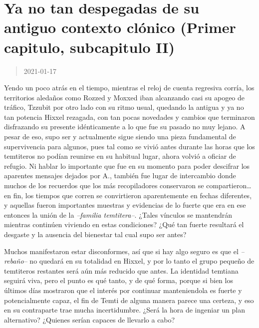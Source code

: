 \documentclass[
  spanish,
]{book}
\begin{document}
\hypertarget{ya-no-tan-despegadas-de-su-antiguo-contexto-cluxf3nico-primer-capitulo-subcapitulo-ii}{%
\section{Ya no tan despegadas de su antiguo contexto clónico (Primer capitulo, subcapitulo II)}\label{ya-no-tan-despegadas-de-su-antiguo-contexto-cluxf3nico-primer-capitulo-subcapitulo-ii}}

\begin{quote}
2021-01-17
\end{quote}

Yendo un poco atrás en el tiempo, mientras el reloj de cuenta regresiva corría, los territorios aledaños como Rozzed y Moxxed iban alcanzando casi su apogeo de tráfico, Tzzubit por otro lado con su ritmo usual, quedando la antigua y ya no tan potencia Hixxel rezagada, con tan pocas novedades y cambios que terminaron disfrazando su presente idénticamente a lo que fue su pasado no muy lejano.
A pesar de eso, supo ser y actualmente sigue siendo una pieza fundamental de supervivencia para algunos, pues tal como se vivió antes durante las horas que los temtiteros no podían reunirse en su habitual lugar, ahora volvió a oficiar de refugio. Ni hablar lo importante que fue en su momento para poder descifrar los aparentes mensajes dejados por A., también fue lugar de intercambio donde muchos de los recuerdos que los más recopiladores conservaron se compartieron\ldots{} en fin, los tiempos que corren se convirtieron aparentemente en fechas diferentes, y aquellas fueron importantes muestras y evidencias de lo fuerte que era en ese entonces la unión de la \emph{--familia temtitera--}. ¿Tales vínculos se mantendrán mientras continúen viviendo en estas condiciones? ¿Qué tan fuerte resultará el desgaste y la ausencia del bienestar tal cual supo ser antes?

Muchos manifestaron estar disconformes, así que si hay algo seguro es que el \emph{--rebaño--} no quedará en su totalidad en Hixxel, y por lo tanto el grupo pequeño de temtiteros restantes será aún más reducido que antes.
La identidad temtiana seguirá viva, pero el punto es qué tanto, y de qué forma, porque si bien los últimos días mostraron que el interés por continuar manteniendola es fuerte y potencialmente capaz, el fin de Temti de alguna manera parece una certeza, y eso en su contraparte trae mucha incertidumbre. ¿Será la hora de ingeniar un plan alternativo? ¿Quienes serían capaces de llevarlo a cabo?
\end{document}
